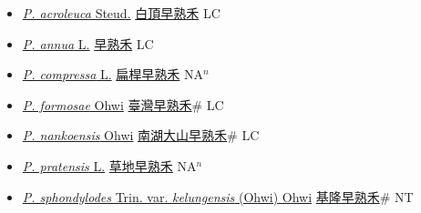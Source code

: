 \begin{itemize}
  \begin{itemize}
        \item[] \href{http://www.theplantlist.org/tpl1.1/search?q=Poa+acroleuca}{\textit{P. acroleuca} Steud.}   \href{\detokenize{http://taibnet.sinica.edu.tw/chi/taibnet_species_list.php?T2=白頂早熟禾&T2_new_value=true&fr=y}}{白頂早熟禾} LC
        \item[] \href{http://www.theplantlist.org/tpl1.1/search?q=Poa+annua}{\textit{P. annua} L.}   \href{\detokenize{http://taibnet.sinica.edu.tw/chi/taibnet_species_list.php?T2=早熟禾&T2_new_value=true&fr=y}}{早熟禾} LC
        \item[] \href{http://www.theplantlist.org/tpl1.1/search?q=Poa+compressa}{\textit{P. compressa} L.}   \href{\detokenize{http://taibnet.sinica.edu.tw/chi/taibnet_species_list.php?T2=扁桿早熟禾&T2_new_value=true&fr=y}}{扁桿早熟禾} NA$^n$
        \item[] \href{http://www.theplantlist.org/tpl1.1/search?q=Poa+formosae}{\textit{P. formosae} Ohwi}   \href{\detokenize{http://taibnet.sinica.edu.tw/chi/taibnet_species_list.php?T2=臺灣早熟禾&T2_new_value=true&fr=y}}{臺灣早熟禾}\# LC
        \item[] \href{http://www.theplantlist.org/tpl1.1/search?q=Poa+nankoensis}{\textit{P. nankoensis} Ohwi}   \href{\detokenize{http://taibnet.sinica.edu.tw/chi/taibnet_species_list.php?T2=南湖大山早熟禾&T2_new_value=true&fr=y}}{南湖大山早熟禾}\# LC
        \item[] \href{http://www.theplantlist.org/tpl1.1/search?q=Poa+pratensis}{\textit{P. pratensis} L.}   \href{\detokenize{http://taibnet.sinica.edu.tw/chi/taibnet_species_list.php?T2=草地早熟禾&T2_new_value=true&fr=y}}{草地早熟禾} NA$^n$
        \item[] \href{http://www.theplantlist.org/tpl1.1/search?q=Poa+sphondylodes+var.+kelungensis}{\textit{P. sphondylodes} Trin. var. \textit{kelungensis} (Ohwi) Ohwi}   \href{\detokenize{http://taibnet.sinica.edu.tw/chi/taibnet_species_list.php?T2=基隆早熟禾&T2_new_value=true&fr=y}}{基隆早熟禾}\# NT

\end{itemize}
\end{itemize}
